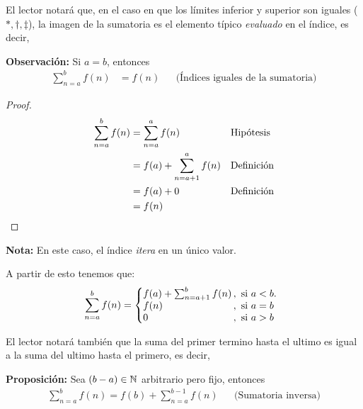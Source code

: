   El lector notará que, en el caso en que los límites inferior y superior son iguales ($*, \dag, \ddag$), la imagen de la sumatoria es el elemento típico \textit{evaluado} en el índice, es decir,

  \textbf{Observación:} Si $a=b$, entonces
  \begin{align*}
    \sum_{n=a}^{b} f(n) &= f(n) && \text{(Índices iguales de la sumatoria)}
  \end{align*}

  \begin{proof}\leavevmode
  \begin{align*}
    \sum_{n=a}^{b} f(n) &= \sum_{n=a}^{a} f(n) && \text{Hipótesis}\\
    &= f(a) + \sum_{n=a+1}^{a} f(n) && \text{Definición}\\
    &= f(a) + 0 && \text{Definición}\\
    &= f(n) && \qedhere
  \end{align*}
  \end{proof}

  \textbf{Nota:} En este caso, el índice \textit{itera} en un único valor.

  A partir de esto tenemos que:
  \[
    \sum_{n=a}^{b} f(n) = \left\{
    \begin{array}{@{}l@{\thinspace}l}
    f(a) + \sum_{n=a+1}^{b} f(n) &,  \ \text{si}  \ a<b.\\
    f(n) &,  \ \text{si}  \ a=b\\
    0 &,  \ \text{si}  \ a>b
    \end{array} \right. \]

    El lector notará también que la suma del primer termino hasta el ultimo es
    igual a la suma del ultimo hasta el primero, es decir,

    \textbf{Proposición:} Sea $(b-a)\in \mathbb{N}$ arbitrario pero fijo, entonces
    \begin{align*}
      \sum_{n=a}^{b} f(n) = f(b) + \sum_{n=a}^{b-1} f(n) && \text{(Sumatoria inversa)}
    \end{align*}


